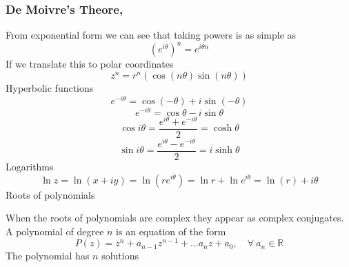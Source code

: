 \documentclass[11pt,titlepage]{article}
\numberwithin{equation}{section}
\begin{document}
\subsubsection{De Moivre's Theore,}
From exponential form we can see that taking powers is as simple as
\begin{equation}
    (e^{i\theta})^n=e^{i\theta n}
\end{equation}
If we translate this to polar coordinates
\begin{equation}
    z^n=r^n(\cos(n\theta)\sin(n\theta))
\end{equation}
Hyperbolic functions
\begin{equation}
    e^{-i\theta}=\cos(-\theta)+i\sin(-\theta)
\end{equation}
\begin{equation}
    e^{-i\theta}=\cos \theta-i\sin \theta
\end{equation}
\begin{equation}
    \cos i\theta=\frac{e^{i\theta}+{e^{-i\theta}}}{2}=\cosh \theta
\end{equation}
\begin{equation}
    \sin i\theta=\frac{e^{i\theta}-e^{-i\theta}}{2}=i\sinh \theta
\end{equation}
Logarithms
\begin{equation}
    \ln z=\ln(x+iy)=\ln(re^{i\theta})=\ln r +\ln e^{i\theta}=\ln (r)+i\theta
\end{equation}
Roots of polynomials

When the roots of polynomials are complex they appear as complex conjugates. A polynomial of degree $n$ is an equation of the form
\begin{equation}
    P(z)=z^n+a_{n-1}z^{n-1}+\dots a_{n}z+a_{0},\quad\forall \ a_{n} \in \mathbb R
\end{equation}
The polynomial has $n$ solutions
\end{document}
